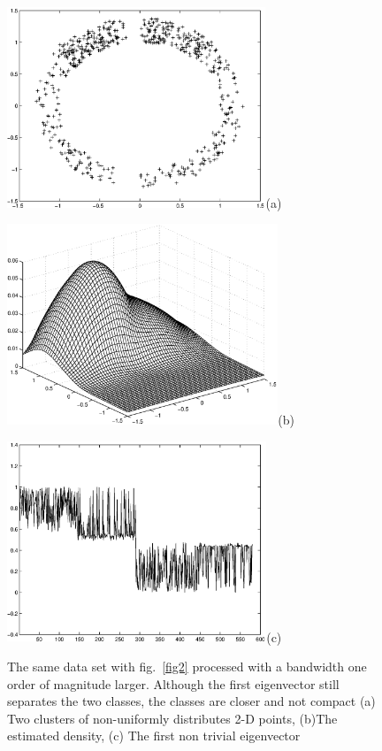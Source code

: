\documentclass[12pt,letterpaper,doublespaced,ETD,dvips,proposal]{gtthesis}
\begin{document}
\begin{Body}
\begin{figure}[!htb]
 \centerline{\includegraphics[height=6cm]{fig3a.eps}(a)}
 \centerline{\includegraphics[height=6cm]{fig3b.eps}(b)}
 \centerline{\includegraphics[height=6cm]{fig3c.eps}(c)}
\caption{The same data set with fig.~\ref{fig2} processed with a
bandwidth one order of magnitude larger. Although the first
eigenvector still separates the two classes, the classes are closer
and not compact (a) Two clusters of non-uniformly distributes 2-D
points, (b)The estimated density, (c) The first non trivial
eigenvector }
  \label{fig3}
\end{figure}



\end{Body}
\end{document}
